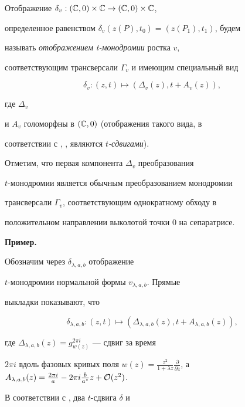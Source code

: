 Отображение $\delta_v :(\Bbb C,0)\times \Bbb C \to (\Bbb C,0)\times \Bbb C$,


определенное равенством $\delta_v(z(P),t_0)=(z(P_1),t_1)$, будем


называть {\it отображением t-монодромии } ростка $v$,


соответствующим трансверсали $\Gamma_v$ и имеющим специальный вид


$$


\delta_v:(z,t)\mapsto (\Delta_v(z),t+A_v(z)),


$$


где $\Delta_v$


и $A_v$ голоморфны в $(\Bbb C,0)$ (отображения такого вида, в


соответствии с \cite{3}, \cite{5}, являются {\it $t$-сдвигами}).


Отметим, что первая компонента $\Delta_v$ преобразования


$t$-монодромии является обычным преобразованием монодромии


трансверсали $\Gamma_v$, соответствующим однократному обходу в


положительном направлении выколотой точки 0 на сепаратрисе.


\medskip





{\bf Пример.}


Обозначим через $\delta_{\lambda,a,b}$ отображение


$t$-монодромии нормальной формы $v_{\lambda,a,b}$. Прямые


выкладки показывают, что


$$


\delta_{\lambda,a,b}:(z,t)\mapsto


(\Delta_{\lambda,a,b}(z),t+A_{\lambda,a,b}(z)),


$$


где $\Delta_{\lambda,a,b}(z)=g^{2\pi i}_{w(z)}$ --- сдвиг за время


$2\pi i$ вдоль фазовых кривых поля $w(z)=\frac{z^2}{1+\lambda


z}\frac{\partial}{\partial z}$, а $A_{\lambda,a,b}(z)=\frac{2\pi


i}{a}-2\pi i\frac{b}{a^z}z+{\cal O}(z^2)$.


\medskip





В соответствии с \cite{3}, \cite{5} два $t$-сдвига $\delta$ и


